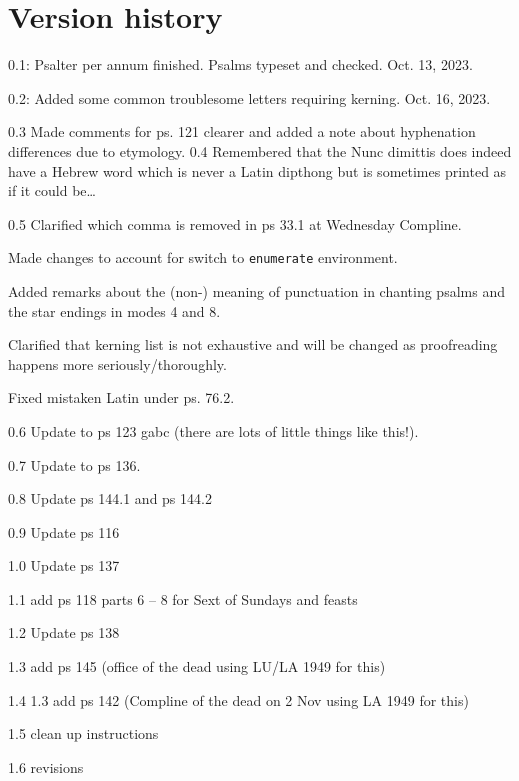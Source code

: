 \documentclass[11pt]{article}
\begin{document}
  \section{Version history}
0.1: Psalter per annum finished. Psalms typeset and checked. Oct. 13, 2023.

0.2: Added some common troublesome letters requiring kerning. Oct. 16, 2023. 

0.3 Made comments for ps. 121 clearer and added a note about hyphenation differences due to etymology.
0.4 Remembered that the Nunc dimittis does indeed have a Hebrew word which is never a Latin dipthong but is sometimes printed as if it could be…

0.5 Clarified which comma is removed in ps 33.1 at Wednesday Compline. 

Made changes to account for switch to \verb|enumerate| environment.

Added remarks about the (non-) meaning of punctuation in chanting psalms and the star endings in modes 4 and 8.

Clarified that kerning list is not exhaustive and will be changed as proofreading happens more seriously/thoroughly.

Fixed mistaken Latin under ps. 76.2.

0.6 Update to ps 123 gabc (there are lots of little things like this!).

0.7 Update to ps 136.

0.8 Update ps 144.1 and ps 144.2

0.9 Update ps 116

1.0 Update ps 137

1.1 add ps 118 parts 6 – 8 for Sext of Sundays and feasts

1.2 Update ps 138

1.3 add ps 145 (office of the dead using LU/LA 1949 for this)

1.4 1.3 add ps 142 (Compline of the dead on 2 Nov using LA 1949 for this)

1.5 clean up instructions

1.6 revisions
\end{document}
